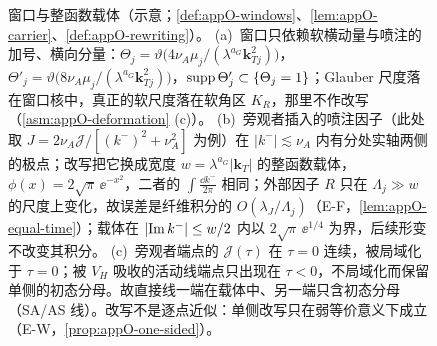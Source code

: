\begin{figure}[htbp]
\caption{窗口与整函数载体（示意；\cref{def:appO-windows}、\cref{lem:appO-carrier}、\cref{def:appO-rewriting}）。
(a)~窗口只依赖软横动量与喷注的加号、横向分量：$\Theta_j=\vartheta\big(4\nu_A\mu_j/(\lambda^{a_G}\mathbf k_{Tj}^2)\big)$，$\Theta'_j=\vartheta\big(8\nu_A\mu_j/(\lambda^{a_G}\mathbf k_{Tj}^2)\big)$，${\rm supp}\,\Theta'_j\subset\{\Theta_j=1\}$；Glauber 尺度落在窗口核中，真正的软尺度落在软角区 $K_R$，那里不作改写（\cref{asm:appO-deformation} (c)）。
(b)~旁观者插入的喷注因子（此处取 $J=2\nu_A\mathcal J/[(k^-)^2+\nu_A^2]$ 为例）在 $|k^-|\lesssim\nu_A$ 内有分处实轴两侧的极点；改写把它换成宽度 $w=\lambda^{a_G}|\mathbf k_T|$ 的整函数载体，$\phi(x)=2\sqrt\pi\,\ee^{-x^2}$，二者的 $\int\frac{\dd k^-}{2\pi}$ 相同；外部因子 $R$ 只在 $\Lambda_j\gg w$ 的尺度上变化，故误差是纤维积分的 $O(\lambda_J/\Lambda_j)$（E-F，\cref{lem:appO-equal-time}）；载体在 $|{\rm Im}\,k^-|\le w/2$ 内以 $2\sqrt\pi\,\ee^{1/4}$ 为界，后续形变不改变其积分。
(c)~旁观者端点的 $\mathcal J(\tau)$ 在 $\tau=0$ 连续，被局域化于 $\tau=0$；被 $V_H$ 吸收的活动线端点只出现在 $\tau<0$，不局域化而保留单侧的初态分母。故直接线一端在载体中、另一端只含初态分母（SA/AS 线）。改写不是逐点近似：单侧改写只在弱等价意义下成立（E-W，\cref{prop:appO-one-sided}）。}
\label{fig:appO-windows}
\end{figure}

